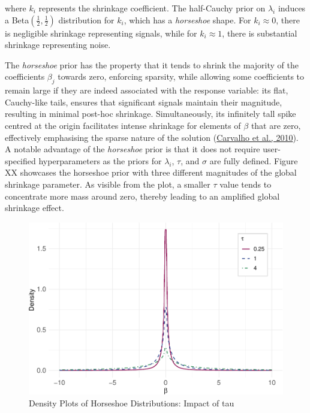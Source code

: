 \documentclass[
  11pt,
]{article}
\begin{document}
where \(k_i\) represents the shrinkage coefficient. The half-Cauchy
prior on \(\lambda_i\) induces a Beta\((\frac{1}{2}, \frac{1}{2})\)
distribution for \(k_i\), which has a \emph{horseshoe} shape. For
\(k_i \approx 0\), there is negligible shrinkage representing signals,
while for \(k_i \approx 1\), there is substantial shrinkage representing
noise.

The \emph{horseshoe} prior has the property that it tends to shrink the
majority of the coefficients \(\beta_j\) towards zero, enforcing
sparsity, while allowing some coefficients to remain large if they are
indeed associated with the response variable: its flat, Cauchy-like
tails, ensures that significant signals maintain their magnitude,
resulting in minimal post-hoc shrinkage. Simultaneously, its infinitely
tall spike centred at the origin facilitates intense shrinkage for
elements of \(\beta\) that are zero, effectively emphasising the sparse
nature of the solution (\protect\hyperlink{ref-Carvalho2010}{Carvalho et
al., 2010}). A notable advantage of the \emph{horseshoe} prior is that
it does not require user-specified hyperparameters as the priors for
\(\lambda_i\), \(\tau\), and \(\sigma\) are fully defined. Figure XX
showcases the horseshoe prior with three different magnitudes of the
global shrinkage parameter. As visible from the plot, a smaller \(\tau\)
value tends to concentrate more mass around zero, thereby leading to an
amplified global shrinkage effect.

\begin{figure}

{\centering \includegraphics[width=0.75\linewidth]{dissertation_files/figure-latex/Horseshoe Priors-1} 

}

\caption{Density Plots of Horseshoe Distributions: Impact of tau}\label{fig:Horseshoe Priors}
\end{figure}
\end{document}
